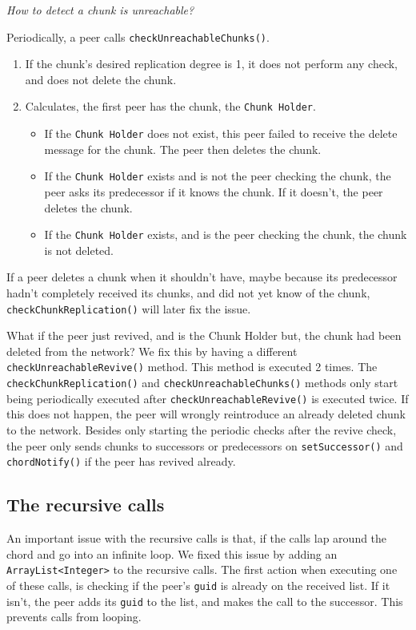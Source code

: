 \documentclass[11pt]{article}
\begin{document}
\textit{How to detect a chunk is unreachable?}

Periodically, a peer calls \verb|checkUnreachableChunks()|.
\begin{enumerate}
\item If the chunk's desired replication degree is 1, it does not perform any check, and does not delete the chunk.
\item Calculates, the first peer has the chunk, the \verb|Chunk Holder|.
\begin{itemize}
\item If the \verb|Chunk Holder| does not exist, this peer failed to receive the delete message for the chunk. The peer then deletes the chunk.
\item If the \verb|Chunk Holder| exists and is not the peer checking the chunk, the peer asks its predecessor if it knows the chunk. If it doesn't, the peer deletes the chunk.
\item If the \verb|Chunk Holder| exists, and is the peer checking the chunk, the chunk is not deleted.
\end{itemize}
\end{enumerate}

If a peer deletes a chunk when it shouldn't have, maybe because its predecessor hadn't completely received its chunks, and did not yet know of the chunk, \verb|checkChunkReplication()| will later fix the issue.

What if the peer just revived, and is the Chunk Holder but, the chunk had been deleted from the network? We fix this by having a different \verb|checkUnreachableRevive()| method. This method is executed 2 times. The \verb|checkChunkReplication()| and \verb|checkUnreachableChunks()| methods only start being periodically executed after \verb|checkUnreachableRevive()| is executed twice. If this does not happen, the peer will wrongly reintroduce an already deleted chunk to the network. Besides only starting the periodic checks after the revive check, the peer only sends chunks to successors or predecessors on \verb|setSuccessor()| and \verb|chordNotify()| if the peer has revived already.


\subsection{The recursive calls}
An important issue with the recursive calls is that, if the calls lap around the chord and go into an infinite loop. We fixed this issue by adding an \verb|ArrayList<Integer>| to the recursive calls. The first action when executing one of these calls, is checking if the peer's \verb|guid| is already on the received list. If it isn't, the peer adds its \verb|guid| to the list, and makes the call to the successor. This prevents calls from looping.
\end{document}

